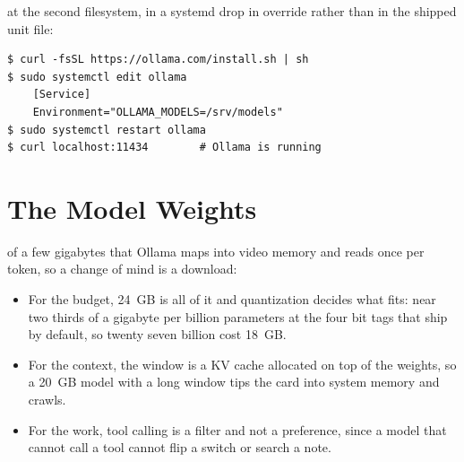 
 at the second filesystem, in a
systemd drop in override rather than in the shipped unit file:

\begin{verbatim}
$ curl -fsSL https://ollama.com/install.sh | sh
$ sudo systemctl edit ollama
    [Service]
    Environment="OLLAMA_MODELS=/srv/models"
$ sudo systemctl restart ollama
$ curl localhost:11434        # Ollama is running
\end{verbatim}


\clearpage
\section{The Model Weights}

 of a few gigabytes that Ollama maps into video
memory and reads once per token, so a change of mind is a download\cite{ollamaLibrary}:

\begin{itemize}[topsep=0.25em, itemsep=0.4em, parsep=0em]
    \item For the budget, 24~GB is all of it and quantization decides what
    fits: near two thirds of a gigabyte per billion parameters at the four bit
    tags that ship by default, so twenty seven billion cost 18~GB.
    \item For the context, the window is a KV cache allocated on top
    of the weights, so a 20~GB model with a long window tips the card into system
    memory and crawls.
    \item For the work, tool calling is a filter and not a preference, since a
    model that cannot call a tool cannot flip a switch or search a note.
\end{itemize}

